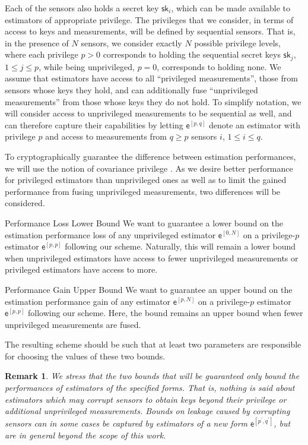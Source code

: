 \documentclass[letterpaper, 10 pt, conference]{ieeeconf}
\newtheorem{remark}{Remark}
\begin{document}
Each of the sensors also holds a secret key $\mathsf{sk}_i$, which can be made available to estimators of appropriate privilege. The privileges that we consider, in terms of access to keys and measurements, will be defined by sequential sensors. That is, in the presence of $N$ sensors, we consider exactly $N$ possible privilege levels, where each privilege $p>0$ corresponds to holding the sequential secret keys $\mathsf{sk}_j$, $1\leq j \leq p$, while being unprivileged, $p=0$, corresponds to holding none. We assume that estimators have access to all ``privileged measurements'', those from sensors whose keys they hold, and can additionally fuse ``unprivileged measurements'' from those whose keys they do not hold. To simplify notation, we will consider access to unprivileged measurements to be sequential as well, and can therefore capture their capabilities by letting $\mathsf{e}^{[p,q]}$ denote an estimator with privilege $p$ and access to measurements from $q\geq p$ sensors $i$, $1\leq i \leq q$.

To cryptographically guarantee the difference between estimation performances, we will use the notion of covariance privilege \cite{risticCryptographicallyPrivilegedState2022}. As we desire better performance for privileged estimators than unprivileged ones as well as to limit the gained performance from fusing unprivileged measurements, two differences will be considered.
\begin{LaTeXdescription}
  \item[Performance Loss Lower Bound] We want to guarantee a lower bound on the estimation performance loss of any unprivileged estimator $\mathsf{e}^{[0,N]}$ on a privilege-$p$ estimator $\mathsf{e}^{[p,p]}$ following our scheme. Naturally, this will remain a lower bound when unprivileged estimators have access to fewer unprivileged measurements or privileged estimators have access to more.
  \item[Performance Gain Upper Bound] We want to guarantee an upper bound on the estimation performance gain of any estimator $\mathsf{e}^{[p,N]}$ on a privilege-$p$ estimator $\mathsf{e}^{[p,p]}$ following our scheme. Here, the bound remains an upper bound when fewer unprivileged measurements are fused.
\end{LaTeXdescription}
The resulting scheme should be such that at least two parameters are responsible for choosing the values of these two bounds.
\begin{remark}
  We stress that the two bounds that will be guaranteed only bound the performances of estimators of the specified forms. That is, nothing is said about estimators which may corrupt sensors to obtain keys beyond their privilege or additional unprivileged measurements. Bounds on leakage caused by corrupting sensors can in some cases be captured by estimators of a new form $\mathsf{e}^{[p^\prime,q^\prime]}$, but are in general beyond the scope of this work.
\end{remark}
\end{document}
